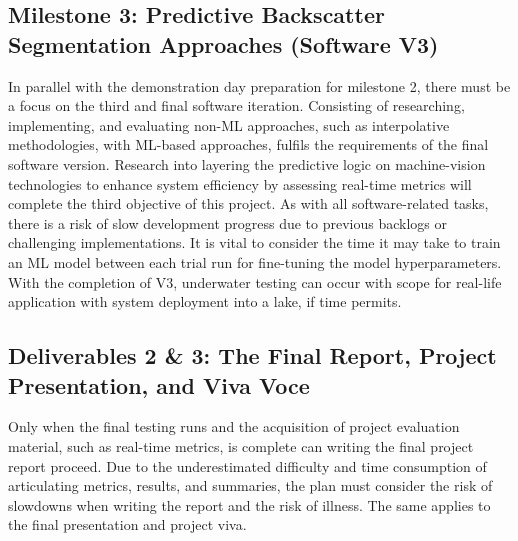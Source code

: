 \subsection{Milestone 3: Predictive Backscatter Segmentation Approaches (Software V3)}
In parallel with the demonstration day preparation for milestone 2, there must be a focus on the third and final software iteration. Consisting of researching, implementing, and evaluating non-ML approaches, such as interpolative methodologies, with ML-based approaches, fulfils the requirements of the final software version. Research into layering the predictive logic on machine-vision technologies to enhance system efficiency by assessing real-time metrics will complete the third objective of this project. As with all software-related tasks, there is a risk of slow development progress due to previous backlogs or challenging implementations. It is vital to consider the time it may take to train an ML model between each trial run for fine-tuning the model hyperparameters. With the completion of V3, underwater testing can occur with scope for real-life application with system deployment into a lake, if time permits.

\subsection{Deliverables 2 \& 3: The Final Report, Project Presentation, and Viva Voce}
Only when the final testing runs and the acquisition of project evaluation material, such as real-time metrics, is complete can writing the final project report proceed. Due to the underestimated difficulty and time consumption of articulating metrics, results, and summaries, the plan must consider the risk of slowdowns when writing the report and the risk of illness. The same applies to the final presentation and project viva.
